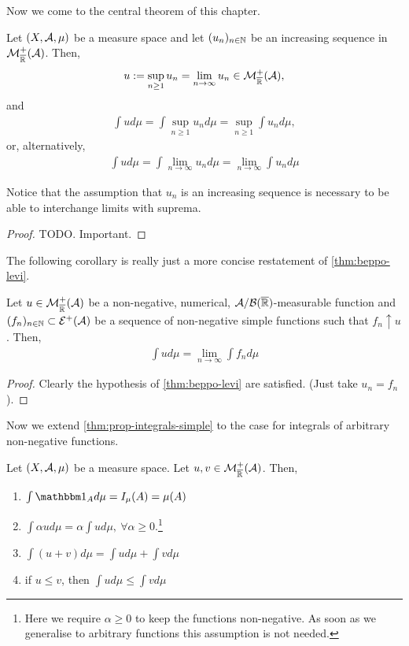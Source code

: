 Now we come to the central theorem of this chapter.

\begin{thm}
	\label{thm:beppo-levi}
	Let $(X, \mathcal{A}, \mu)$ be a measure space and let $(u_n)_{n\in\mathbb{N}}$ be an increasing sequence in $\mathcal{M}^+_{\overline{\mathbb{R}}}(\mathcal{A})$. Then,
	\begin{align*}
		u := \sup_{n \geq 1} u_n = \lim_{n \to \infty} u_n \in \mathcal{M}_{\overline{\mathbb{R}}}^+(\mathcal{A}),
	\end{align*}
	and
	\begin{align}
		\int u d\mu = \int \sup_{n \geq 1} u_n d\mu = \sup_{n \geq 1} \int u_n d\mu,
	\end{align}
	or, alternatively,
	\begin{align}
		\int u d\mu = \int \lim_{n \to \infty} u_n d\mu = \lim_{n \to \infty} \int u_n d\mu
	\end{align}
\end{thm}

Notice that the assumption that $u_n$ is an increasing sequence is necessary to be able to interchange limits with suprema.

\begin{proof}
	TODO. Important.
\end{proof}

The following corollary is really just a more concise restatement of \autoref{thm:beppo-levi}.
\begin{cor}
	\label{cor:beppo-levi}
	Let $u \in \mathcal{M}_{\overline{\mathbb{R}}}^+(\mathcal{A})$ be a non-negative, numerical, $\mathcal{A}/\mathcal{B}({\overline{\mathbb{R}}})$-measurable function and $(f_n)_{n\in\mathbb{N}} \subset \mathcal{E}^+(\mathcal{A})$ be a sequence of non-negative simple functions such that $f_n \uparrow u$. Then,
	\begin{align}
		\int u d\mu = \lim_{n \to \infty} \int f_n d\mu
	\end{align}
\end{cor}

\begin{proof}
	Clearly the hypothesis of \autoref{thm:beppo-levi} are satisfied. (Just take $u_n = f_n$).
\end{proof}

Now we extend \autoref{thm:prop-integrals-simple} to the case for integrals of arbitrary non-negative functions.

\begin{thm}
	\label{thm:prop-integrals}
	Let $(X, \mathcal{A}, \mu)$ be a measure space. Let $u, v \in \mathcal{M}^+_{\overline{\mathbb{R}}}(\mathcal{A})$. Then,
	\begin{enumerate}
		\item $\int \ind_{A} d\mu = I_\mu(A) = \mu(A)$
		\item $\int \alpha u d\mu = \alpha \int u d\mu,\ \forall \alpha \geq 0$.\footnote{Here we require $\alpha \geq 0$ to keep the functions non-negative. As soon as we generalise to arbitrary functions this assumption is not needed.}
		\item $\int (u + v)d\mu = \int u d\mu + \int v d\mu$
		\item if $u \leq v$, then $\int u d\mu \leq \int v d\mu$
	\end{enumerate}
\end{thm}

